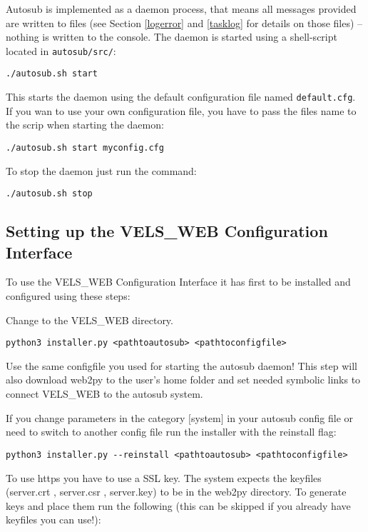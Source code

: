 Autosub is implemented as a daemon process, that means all messages provided are written
to files (see Section \ref{logerror} and \ref{tasklog} for details on those files) -- 
nothing is written to the console. The daemon is started using a shell-script located
in {\tt autosub/src/}:

\begin{verbatim}
./autosub.sh start
\end{verbatim}

This starts the daemon using the default configuration file named {\tt default.cfg}. If you
wan to use your own configuration file, you have to pass the files name to the scrip when
starting the daemon:

\begin{verbatim}
./autosub.sh start myconfig.cfg
\end{verbatim}

To stop the daemon just run the command:

\begin{verbatim}
./autosub.sh stop
\end{verbatim}

\subsection{Setting up the VELS\_WEB Configuration Interface}
To use the VELS\_WEB Configuration Interface it has first to be installed and
configured using these steps:

Change to the VELS\_WEB directory.

\begin{verbatim}
python3 installer.py <pathtoautosub> <pathtoconfigfile>
\end{verbatim}

Use the same configfile you used for starting the autosub daemon! This step will
also download web2py to the user's home folder and set needed symbolic links to 
connect VELS\_WEB to the autosub system.

If you change parameters in the category $[$system$]$ in your autosub config file or need to switch to 
another config file run the installer with the reinstall flag:

\begin{verbatim}
python3 installer.py --reinstall <pathtoautosub> <pathtoconfigfile>
\end{verbatim}

To use https you have to use a SSL key. The system expects the keyfiles
(server.crt , server.csr , server.key) to be in the web2py directory. To
generate keys and place them run the following (this can be skipped if you 
already have keyfiles you can use!):

